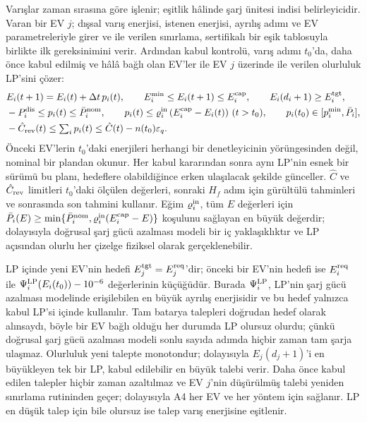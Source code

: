 Varışlar zaman sırasına göre işlenir; eşitlik hâlinde şarj ünitesi indisi belirleyicidir.
Varan bir EV $j$; dışsal varış enerjisi, istenen enerjisi, ayrılış adımı ve EV parametreleriyle girer ve  ile verilen sınırlama, sertifikalı bir eşik tablosuyla birlikte ilk gereksinimini verir.
Ardından kabul kontrolü, varış adımı $t_0$'da, daha önce kabul edilmiş ve hâlâ bağlı olan EV'ler ile EV $j$ üzerinde  ile verilen olurluluk LP'sini çözer:
\begin{equation}\label{eq:admission}
\begin{aligned}
&E_i(t+1)=E_i(t)+\Delta t\,p_i(t),\qquad E_i^{\min}\le E_i(t+1)\le E_i^{\mathrm{cap}},\qquad E_i(d_i+1)\ge E_i^{\mathrm{tgt}},\\
&-P^{\mathrm{dis}}_i\le p_i(t)\le\bar P^{\mathrm{nom}}_i,\qquad p_i(t)\le\varrho_i^{\mathrm{in}}\,(E_i^{\mathrm{cap}}-E_i(t))\ (t>t_0),\qquad p_i(t_0)\in[p^{\min}_i,\bar P_i],\\
&-\hat C_{\mathrm{rev}}(t)\le\textstyle\sum_ip_i(t)\le\hat C(t)-n(t_0)\varepsilon_q .
\end{aligned}
\end{equation}
Önceki EV'lerin $t_0$'daki enerjileri herhangi bir denetleyicinin yörüngesinden değil, nominal bir plandan okunur.
Her kabul kararından sonra aynı LP'nin esnek bir sürümü bu planı, hedeflere olabildiğince erken ulaşılacak şekilde günceller.
$\hat C$ ve $\hat C_{\mathrm{rev}}$ limitleri $t_0$'daki ölçülen değerleri, sonraki $H_f$ adım için gürültülü tahminleri ve sonrasında son tahmini kullanır.
Eğim $\varrho_i^{\mathrm{in}}$, tüm $E$ değerleri için $\bar P_i(E)\ge\min\{\bar P^{\mathrm{nom}}_i,\varrho_i^{\mathrm{in}}(E_i^{\mathrm{cap}}-E)\}$ koşulunu sağlayan en büyük değerdir; dolayısıyla doğrusal şarj gücü azalması modeli bir iç yaklaşıklıktır ve LP açısından olurlu her çizelge fiziksel olarak gerçeklenebilir.

LP içinde yeni EV'nin hedefi $E_j^{\mathrm{tgt}}=E^{\mathrm{req}}_j$'dir; önceki bir EV'nin hedefi ise $E^{\mathrm{req}}_i$ ile $\Psi_i^{\mathrm{LP}}(E_i(t_0))-10^{-6}$ değerlerinin küçüğüdür.
Burada $\Psi_i^{\mathrm{LP}}$, LP'nin şarj gücü azalması modelinde erişilebilen en büyük ayrılış enerjisidir ve bu hedef yalnızca kabul LP'si içinde kullanılır.
Tam batarya talepleri doğrudan hedef olarak alınsaydı, böyle bir EV bağlı olduğu her durumda LP olursuz olurdu; çünkü doğrusal şarj gücü azalması modeli sonlu sayıda adımda hiçbir zaman tam şarja ulaşmaz.
Olurluluk yeni talepte monotondur; dolayısıyla $E_j(d_j+1)$'i en büyükleyen tek bir LP, kabul edilebilir en büyük talebi verir.
Daha önce kabul edilen talepler hiçbir zaman azaltılmaz ve EV $j$'nin düşürülmüş talebi yeniden sınırlama rutininden geçer; dolayısıyla A4 her EV ve her yöntem için sağlanır.
LP en düşük talep için bile olursuz ise talep varış enerjisine eşitlenir.

